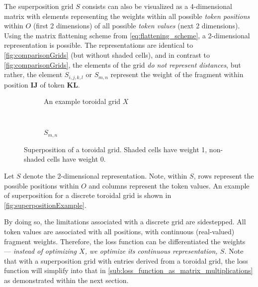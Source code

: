 The superposition grid $S$ consists can also be visualized as a 4-dimensional matrix with elements representing the weights within all possible \emph{token positions} within $O$ (first 2 dimensions) of all possible \emph{token values} (next 2 dimensions). Using the matrix flattening scheme from \autoref{eq:flattening_scheme}, a 2-dimensional representation is possible. The representations are identical to \autoref{fig:comparisonGrids} (but without shaded cells), and in contrast to \autoref{fig:comparisonGrids}, the elements of the grid \emph{do not represent distances}, but rather, the element $S_{i,j,k,l}$ or $S_{m,n}$ represent the weight of the fragment within position $\bm{IJ}$ of token $\bm{KL}$.

\begin{figure}[htpb]
    \centering
    \begin{subfigure}[t]{0.5\textwidth}
    \begin{center}
    \end{center}
    \caption{An example toroidal grid $X$}
    \end{subfigure}%
    ~
    \begin{subfigure}[t]{0.5\textwidth}
    \begin{center}
    \end{center}
    \caption{$S_{m,n}$}
    \label{fig:superpositionShade}
    \end{subfigure}

    \caption{Superposition of a toroidal grid. Shaded cells have weight 1, non-shaded cells have weight 0.}
    \label{fig:superpositionExample}
\end{figure}

Let $S$ denote the 2-dimensional representation. Note, within $S$, rows represent the possible positions within $O$ and columns represent the token values. An example of superposition for a discrete toroidal grid is shown in \autoref{fig:superpositionExample}.

By doing so, the limitations associated with a discrete grid are sidestepped. All token values are associated with all positions, with continuous (real-valued) fragment weights. Therefore, the loss function can be differentiated \wrt{} the weights --- \emph{instead of optimizing $X$, we optimize its continuous representation, $S$.} Note that with a superposition grid with entries derived from a toroidal grid, the loss function will simplify into that in \ref{sub:loss_function_as_matrix_multiplications} as demonstrated within the next section.

